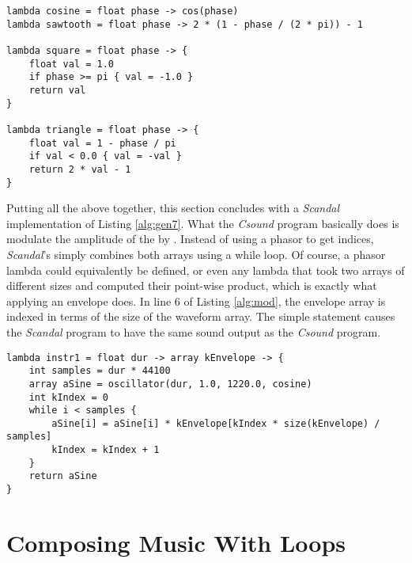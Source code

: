 \begin{lstlisting}[emph={lambda,float,cos,pi,if,return},emphstyle={\textbf},caption={Waveform-generating lambdas.},label={alg:waveforms}]
lambda cosine = float phase -> cos(phase)
lambda sawtooth = float phase -> 2 * (1 - phase / (2 * pi)) - 1

lambda square = float phase -> {
	float val = 1.0
	if phase >= pi { val = -1.0 }
	return val
}

lambda triangle = float phase -> {
	float val = 1 - phase / pi
	if val < 0.0 { val = -val }
	return 2 * val - 1
}
\end{lstlisting}

Putting all the above together, this section concludes with a \emph{Scandal} implementation of Listing \ref{alg:gen7}. What the \emph{Csound} program basically does is modulate the amplitude of the  by . Instead of using a phasor to get indices, \emph{Scandal}'s  simply combines both arrays using a while loop. Of course, a phasor lambda could equivalently be defined, or even any lambda that took two arrays of different sizes and computed their point-wise product, which is exactly what applying an envelope does. In line 6 of Listing \ref{alg:mod}, the envelope array is indexed in terms of the size of the waveform array. The simple statement  causes the \emph{Scandal} program to have the same sound output as the \emph{Csound} program.

\begin{lstlisting}[emph={lambda,float,array,int,while,return},emphstyle={\textbf},caption={Implementing a \emph{Csound} program in \emph{Scandal}.},label={alg:mod}]
lambda instr1 = float dur -> array kEnvelope -> {
	int samples = dur * 44100
	array aSine = oscillator(dur, 1.0, 1220.0, cosine)
	int kIndex = 0
	while i < samples {
		aSine[i] = aSine[i] * kEnvelope[kIndex * size(kEnvelope) / samples]
		kIndex = kIndex + 1
	}
	return aSine
}
\end{lstlisting}

\section{Composing Music With Loops}

